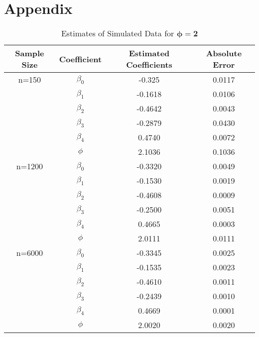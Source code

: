 \documentclass{svproc}
\begin{document}
\section{Appendix}

\begin{table}[H]
\caption{Estimates of Simulated Data for $\bm{\phi=2}$}
\fontsize{9}{10}\selectfont
\begin{center}
\begin{tabular}{|c|c|c|c|}
\hline
\textbf{Sample Size} & \textbf{Coefficient} & \textbf{Estimated Coefficients} & \textbf{Absolute Error} \\
\hline
n=150 & $\beta_0$ & -0.325 & 0.0117 \\
 & $\beta_1$ & -0.1618 &  0.0106 \\
 & $\beta_2$ & -0.4642 & 0.0043 \\
 & $\beta_3$ & -0.2879 & 0.0430 \\
 & $\beta_4$ & 0.4740 & 0.0072 \\
& $\phi$ & 2.1036 & 0.1036 \\
\hline
n=1200 & $\beta_0$ & -0.3320 & 0.0049 \\
 & $\beta_1$ & -0.1530 & 0.0019 \\
 & $\beta_2$ & -0.4608 & 0.0009 \\
 & $\beta_3$ & -0.2500 & 0.0051 \\
 & $\beta_4$ & 0.4665 & 0.0003 \\
 & $\phi$ & 2.0111 & 0.0111 \\
\hline
n=6000 & $\beta_0$ & -0.3345 & 0.0025 \\
 & $\beta_1$ & -0.1535 & 0.0023 \\
 & $\beta_2$ & -0.4610 & 0.0011 \\
 & $\beta_3$ & -0.2439 & 0.0010 \\
 & $\beta_4$ & 0.4669 & 0.0001 \\
 & $\phi$ & 2.0020 & 0.0020 \\
\hline
\end{tabular}
\label{tab:est2}
\end{center}
\end{table}

\smallskip
\end{document}
